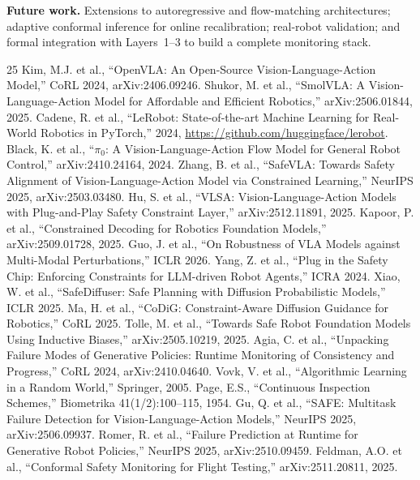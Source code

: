 \documentclass[conference]{IEEEtran}
\begin{document}
\textbf{Future work.}
Extensions to autoregressive and flow-matching architectures;
adaptive conformal inference for online recalibration;
real-robot validation;
and formal integration with Layers~1--3 to build a complete monitoring stack.

\begin{thebibliography}{25}
 Kim, M.J. et al., ``OpenVLA: An Open-Source Vision-Language-Action Model,'' CoRL 2024, arXiv:2406.09246.
 Shukor, M. et al., ``SmolVLA: A Vision-Language-Action Model for Affordable and Efficient Robotics,'' arXiv:2506.01844, 2025.
 Cadene, R. et al., ``LeRobot: State-of-the-art Machine Learning for Real-World Robotics in PyTorch,'' 2024, \url{https://github.com/huggingface/lerobot}.
 Black, K. et al., ``$\pi_0$: A Vision-Language-Action Flow Model for General Robot Control,'' arXiv:2410.24164, 2024.
 Zhang, B. et al., ``SafeVLA: Towards Safety Alignment of Vision-Language-Action Model via Constrained Learning,'' NeurIPS 2025, arXiv:2503.03480.
 Hu, S. et al., ``VLSA: Vision-Language-Action Models with Plug-and-Play Safety Constraint Layer,'' arXiv:2512.11891, 2025.
 Kapoor, P. et al., ``Constrained Decoding for Robotics Foundation Models,'' arXiv:2509.01728, 2025.
 Guo, J. et al., ``On Robustness of VLA Models against Multi-Modal Perturbations,'' ICLR 2026.
 Yang, Z. et al., ``Plug in the Safety Chip: Enforcing Constraints for LLM-driven Robot Agents,'' ICRA 2024.
 Xiao, W. et al., ``SafeDiffuser: Safe Planning with Diffusion Probabilistic Models,'' ICLR 2025.
 Ma, H. et al., ``CoDiG: Constraint-Aware Diffusion Guidance for Robotics,'' CoRL 2025.
 Tolle, M. et al., ``Towards Safe Robot Foundation Models Using Inductive Biases,'' arXiv:2505.10219, 2025.
 Agia, C. et al., ``Unpacking Failure Modes of Generative Policies: Runtime Monitoring of Consistency and Progress,'' CoRL 2024, arXiv:2410.04640.
 Vovk, V. et al., ``Algorithmic Learning in a Random World,'' Springer, 2005.
 Page, E.S., ``Continuous Inspection Schemes,'' Biometrika 41(1/2):100--115, 1954.
 Gu, Q. et al., ``SAFE: Multitask Failure Detection for Vision-Language-Action Models,'' NeurIPS 2025, arXiv:2506.09937.
 Romer, R. et al., ``Failure Prediction at Runtime for Generative Robot Policies,'' NeurIPS 2025, arXiv:2510.09459.
 Feldman, A.O. et al., ``Conformal Safety Monitoring for Flight Testing,'' arXiv:2511.20811, 2025.

\end{thebibliography}
\end{document}
